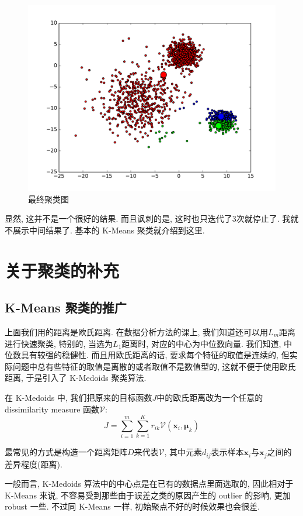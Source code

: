 \documentclass[a4paper,UTF8]{ctexart}
\theoremstyle{plain} \newtheorem{theorem}{定理}[section]
\theoremstyle{plain} \newtheorem{definition}{定义}[section]
\theoremstyle{plain} \newtheorem{lemma}{引理}[section]
\theoremstyle{plain} \newtheorem{proposition}{命题}[section]
\theoremstyle{plain} \newtheorem{example}{例}[section]
\theoremstyle{plain} \newtheorem{remark}{注}[section]
\theoremstyle{plain} \newtheorem{corollary}{推论}[section]
\begin{document}
\begin{figure}[!htb]
	\centering
	\includegraphics[width = 0.75 \textwidth]{iter_13.pdf}
	\caption{最终聚类图}
	\label{iter13}
\end{figure}

显然, 这并不是一个很好的结果. 而且讽刺的是, 这时也只迭代了$3$次就停止了. 我就不展示中间结果了. 基本的 K-Means 聚类就介绍到这里.


\section{关于聚类的补充}
\subsection{K-Means 聚类的推广}
上面我们用的距离是欧氏距离. 在数据分析方法的课上, 我们知道还可以用$L_{m}$距离进行快速聚类, 特别的, 当选为$L_{1}$距离时, 对应的中心为中位数向量. 我们知道, 中位数具有较强的稳健性. 而且用欧氏距离的话, 要求每个特征的取值是连续的, 但实际问题中总有些特征的取值是离散的或者取值不是数值型的, 这就不便于使用欧氏距离, 于是引入了 K-Medoids 聚类算法.

在 K-Medoids 中, 我们把原来的目标函数$J$中的欧氏距离改为一个任意的 dissimilarity measure 函数$\mathcal{V}$:
\begin{equation*}
J = \sum_{i=1}^{m} \sum_{k=1}^{K} r_{ik} \mathcal{V}(\bm{x}_{i}, \bm{\mu}_{k})
\end{equation*}

最常见的方式是构造一个距离矩阵$D$来代表$\mathcal{V}$, 其中元素$d_{ij}$表示样本$\bm{x}_i$与$\bm{x}_j$之间的差异程度(距离).

一般而言, K-Medoids 算法中的中心点是在已有的数据点里面选取的, 因此相对于 K-Means 来说, 不容易受到那些由于误差之类的原因产生的 outlier 的影响, 更加 robust 一些. 不过同 K-Means 一样, 初始聚点不好的时候效果也会很差.
\end{document}
